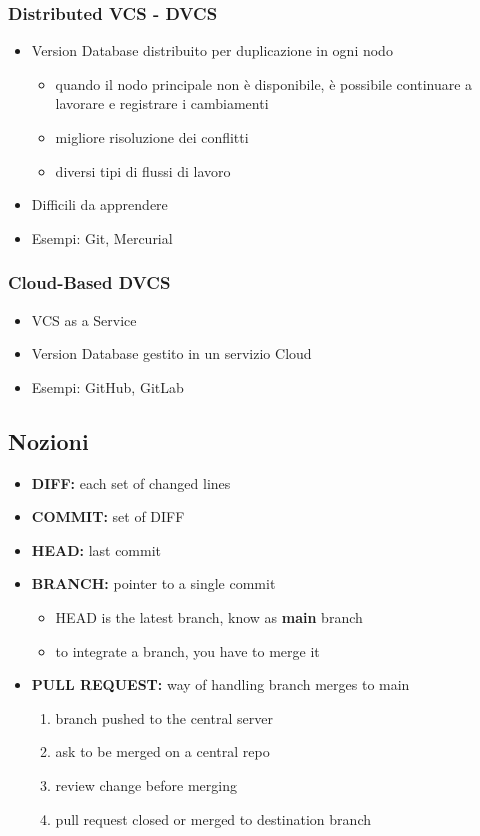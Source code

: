 \subsubsection{Distributed VCS - DVCS}
\begin{itemize}
    \item Version Database distribuito per duplicazione in ogni nodo
    \begin{itemize}
        \item quando il nodo principale non è disponibile, è possibile continuare a lavorare e registrare i cambiamenti
        \item migliore risoluzione dei conflitti
        \item diversi tipi di flussi di lavoro
    \end{itemize}
    \item Difficili da apprendere
    \item Esempi: Git, Mercurial
\end{itemize}

\subsubsection{Cloud-Based DVCS}
\begin{itemize}
    \item VCS as a Service
    \item Version Database gestito in un servizio Cloud
    \item Esempi: GitHub, GitLab
\end{itemize}

\subsection{Nozioni}
\begin{itemize}
    \item \textbf{DIFF:} each set of changed lines
    \item \textbf{COMMIT:} set of DIFF
    \item \textbf{HEAD:} last commit
    \item \textbf{BRANCH:} pointer to a single commit
    \begin{itemize}
        \item HEAD is the latest branch, know as \textbf{main} branch
        \item to integrate a branch, you have to merge it
    \end{itemize}
    \item \textbf{PULL REQUEST:} way of handling branch merges to main
    \begin{enumerate}
        \item branch pushed to the central server
        \item ask to be merged on a central repo
        \item review change before merging
        \item pull request closed or merged to destination branch
    \end{enumerate}
\end{itemize}

